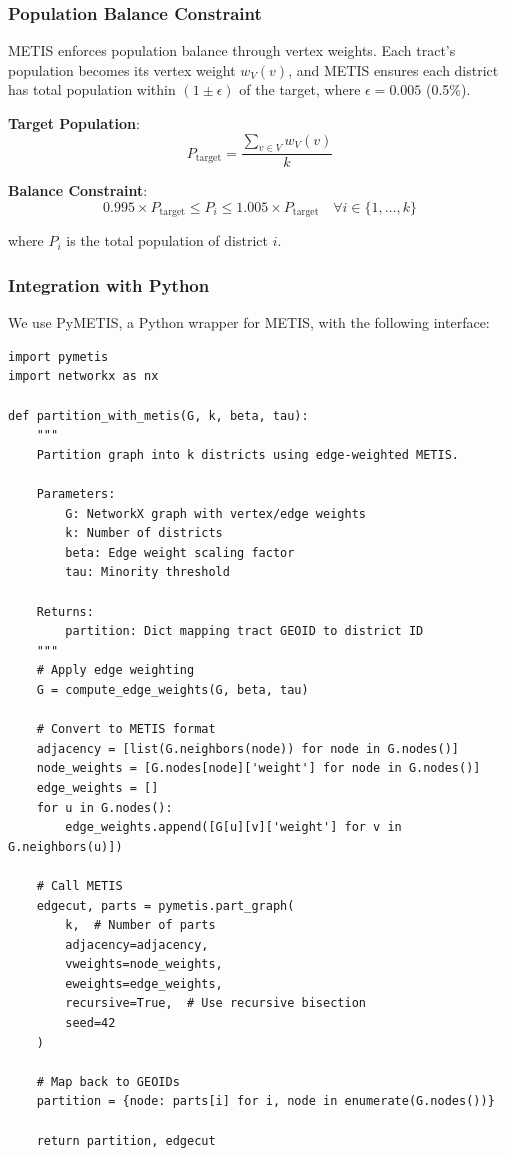 \subsubsection{Population Balance Constraint}

METIS enforces population balance through vertex weights. Each tract's population becomes its vertex weight $w_V(v)$, and METIS ensures each district has total population within $(1 \pm \epsilon)$ of the target, where $\epsilon = 0.005$ (0.5\%).

\textbf{Target Population}:
\[
P_{\text{target}} = \frac{\sum_{v \in V} w_V(v)}{k}
\]

\textbf{Balance Constraint}:
\[
0.995 \times P_{\text{target}} \leq P_i \leq 1.005 \times P_{\text{target}} \quad \forall i \in \{1, \ldots, k\}
\]

where $P_i$ is the total population of district $i$.

\subsubsection{Integration with Python}

We use PyMETIS, a Python wrapper for METIS, with the following interface:

\begin{verbatim}
import pymetis
import networkx as nx

def partition_with_metis(G, k, beta, tau):
    """
    Partition graph into k districts using edge-weighted METIS.

    Parameters:
        G: NetworkX graph with vertex/edge weights
        k: Number of districts
        beta: Edge weight scaling factor
        tau: Minority threshold

    Returns:
        partition: Dict mapping tract GEOID to district ID
    """
    # Apply edge weighting
    G = compute_edge_weights(G, beta, tau)

    # Convert to METIS format
    adjacency = [list(G.neighbors(node)) for node in G.nodes()]
    node_weights = [G.nodes[node]['weight'] for node in G.nodes()]
    edge_weights = []
    for u in G.nodes():
        edge_weights.append([G[u][v]['weight'] for v in G.neighbors(u)])

    # Call METIS
    edgecut, parts = pymetis.part_graph(
        k,  # Number of parts
        adjacency=adjacency,
        vweights=node_weights,
        eweights=edge_weights,
        recursive=True,  # Use recursive bisection
        seed=42
    )

    # Map back to GEOIDs
    partition = {node: parts[i] for i, node in enumerate(G.nodes())}

    return partition, edgecut
\end{verbatim}

